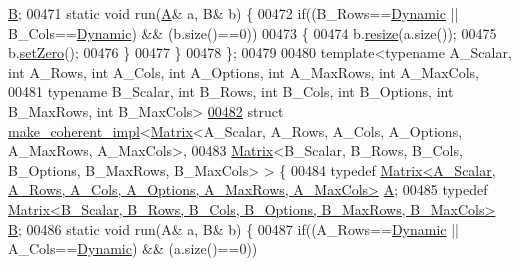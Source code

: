 \begin{DoxyCode}
       \hyperlink{group___core___module_class_eigen_1_1_matrix}{B};
00471   \textcolor{keyword}{static} \textcolor{keywordtype}{void} run(\hyperlink{group___core___module_class_eigen_1_1_matrix}{A}& a, B& b) \{
00472     \textcolor{keywordflow}{if}((B\_Rows==\hyperlink{namespace_eigen_ad81fa7195215a0ce30017dfac309f0b2}{Dynamic} || B\_Cols==\hyperlink{namespace_eigen_ad81fa7195215a0ce30017dfac309f0b2}{Dynamic}) && (b.size()==0))
00473     \{
00474       b.\hyperlink{class_eigen_1_1_plain_object_base_a99d9054ee2d5a40c6e00ded0265e9cea}{resize}(a.size());
00475       b.\hyperlink{class_eigen_1_1_plain_object_base_ac21ad5f989f320e46958b75ac8d9a1da}{setZero}();
00476     \}
00477   \}
00478 \};
00479 
00480 \textcolor{keyword}{template}<\textcolor{keyword}{typename} A\_Scalar, \textcolor{keywordtype}{int} A\_Rows, \textcolor{keywordtype}{int} A\_Cols, \textcolor{keywordtype}{int} A\_Options, \textcolor{keywordtype}{int} A\_MaxRows, \textcolor{keywordtype}{int} A\_MaxCols,
00481          \textcolor{keyword}{typename} B\_Scalar, \textcolor{keywordtype}{int} B\_Rows, \textcolor{keywordtype}{int} B\_Cols, \textcolor{keywordtype}{int} B\_Options, \textcolor{keywordtype}{int} B\_MaxRows, \textcolor{keywordtype}{int} B\_MaxCols>
\hyperlink{struct_eigen_1_1internal_1_1make__coherent__impl_3_01_matrix_3_01_a___scalar_00_01_a___rows_00_02c107ffcc218caac688e11f3e382ff61}{00482} \textcolor{keyword}{struct }\hyperlink{struct_eigen_1_1internal_1_1make__coherent__impl}{make\_coherent\_impl}<\hyperlink{group___core___module_class_eigen_1_1_matrix}{Matrix}<A\_Scalar, A\_Rows, A\_Cols, A\_Options, A\_MaxRows, 
      A\_MaxCols>,
00483                              \hyperlink{group___core___module_class_eigen_1_1_matrix}{Matrix}<B\_Scalar, B\_Rows, B\_Cols, B\_Options, B\_MaxRows, B\_MaxCols> > \{
00484   \textcolor{keyword}{typedef} \hyperlink{group___core___module_class_eigen_1_1_matrix}{Matrix<A\_Scalar, A\_Rows, A\_Cols, A\_Options, A\_MaxRows, A\_MaxCols>}
       \hyperlink{group___core___module_class_eigen_1_1_matrix}{A};
00485   \textcolor{keyword}{typedef} \hyperlink{group___core___module_class_eigen_1_1_matrix}{Matrix<B\_Scalar, B\_Rows, B\_Cols, B\_Options, B\_MaxRows, B\_MaxCols>}
       \hyperlink{group___core___module_class_eigen_1_1_matrix}{B};
00486   \textcolor{keyword}{static} \textcolor{keywordtype}{void} run(A& a, B& b) \{
00487     \textcolor{keywordflow}{if}((A\_Rows==\hyperlink{namespace_eigen_ad81fa7195215a0ce30017dfac309f0b2}{Dynamic} || A\_Cols==\hyperlink{namespace_eigen_ad81fa7195215a0ce30017dfac309f0b2}{Dynamic}) && (a.size()==0))

\end{DoxyCode}
